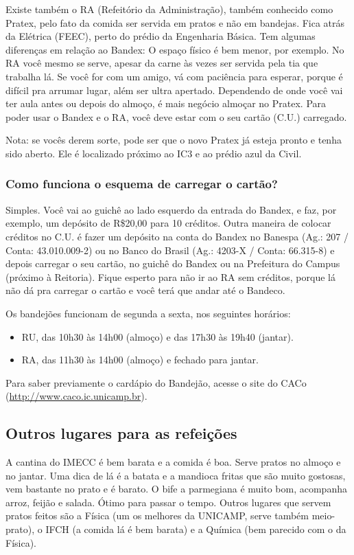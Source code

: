 \documentclass[a4paper,10pt]{article}
\begin{document}
Existe também o RA (Refeitório da Administração), também conhecido como Pratex,
pelo fato da comida ser servida em pratos e não em bandejas. Fica atrás da
Elétrica (FEEC), perto do prédio da Engenharia Básica. Tem algumas diferenças em
relação ao Bandex: O espaço físico é bem menor, por exemplo. No RA você mesmo se
serve, apesar da carne às vezes ser servida pela tia que trabalha lá. Se você
for com um amigo, vá com paciência para esperar, porque é difícil pra arrumar
lugar, além ser ultra apertado. Dependendo de onde você vai ter aula antes ou
depois do almoço, é mais negócio almoçar no Pratex. Para poder usar o Bandex
e o RA, você deve estar com o seu cartão (C.U.) carregado.

Nota: se vocês derem sorte, pode ser que o novo Pratex já esteja pronto e tenha
sido aberto. Ele é localizado próximo ao IC3 e ao prédio azul da Civil. 

\subsubsection{Como funciona o esquema de carregar o cartão?}
Simples. Você vai ao guichê ao lado esquerdo da entrada do Bandex, e faz, por
exemplo, um depósito de R\$20,00 para 10 créditos. Outra maneira de colocar
créditos no C.U. é fazer um depósito na conta do Bandex no Banespa (Ag.: 207
/ Conta: 43.010.009-2) ou no Banco do Brasil (Ag.: 4203-X / Conta: 66.315-8)
e depois carregar o seu cartão, no guichê do Bandex ou na Prefeitura do Campus
(próximo à Reitoria). Fique esperto para não ir ao RA sem créditos, porque lá
não dá pra carregar o cartão e você terá que andar até o Bandeco.

Os bandejões funcionam de segunda a sexta, nos seguintes horários:

\begin{itemize}
\item  RU, das 10h30 às 14h00 (almoço) e das 17h30 às 19h40 (jantar).
\item  RA, das 11h30 às 14h00 (almoço) e fechado para jantar.
\end{itemize}
Para saber previamente o cardápio do Bandejão, acesse o site do CACo (\url{http://www.caco.ic.unicamp.br}).

\subsection{Outros lugares para as refeições}
A cantina do IMECC é bem barata e a comida é boa. Serve pratos no almoço e no
jantar. Uma dica de lá é a batata e a mandioca fritas que são muito gostosas,
vem bastante no prato e é barato. O bife a parmegiana é muito bom, acompanha
arroz, feijão e salada. Ótimo para passar o tempo. Outros lugares que servem
pratos feitos são a Física (um os melhores da UNICAMP, serve também meio-prato),
o IFCH (a comida lá é bem barata) e a Química (bem parecido com o da Física). 
\end{document}

